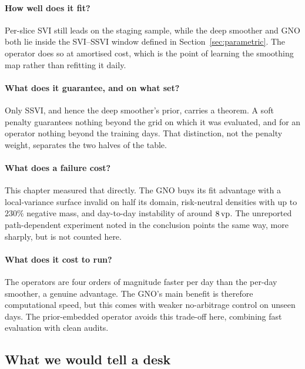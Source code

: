 \paragraph{How well does it fit?} Per-slice SVI still leads on the staging sample, while the
deep smoother and GNO both lie inside the SVI--SSVI window defined in
Section~\ref{sec:parametric}. The operator does so at amortised cost, which is the point of
learning the smoothing map rather than refitting it daily.

\paragraph{What does it guarantee, and on what set?} Only SSVI, and hence the deep
smoother's prior, carries a theorem. A soft penalty guarantees nothing beyond the grid on which
it was evaluated, and for an operator nothing beyond the training days. That distinction, not
the penalty weight, separates the two halves of the table.

\paragraph{What does a failure cost?} This chapter measured that directly. The GNO buys
its fit advantage with a local-variance surface invalid on half its domain,
risk-neutral densities with up to $230\%$ negative mass, and day-to-day instability of
around $8\,\text{vp}$. The unreported path-dependent experiment noted in the conclusion points
the same way, more sharply, but is not counted here.

\paragraph{What does it cost to run?} The operators are four orders of magnitude faster per day
than the per-day smoother, a genuine advantage. The GNO's main benefit is therefore
computational speed, but this comes with weaker no-arbitrage control on unseen days. The
prior-embedded operator avoids this trade-off here, combining fast evaluation with clean audits.

\subsection{What we would tell a desk}

